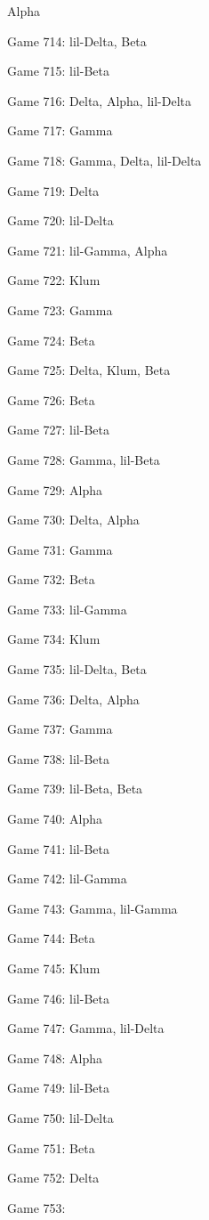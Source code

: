 \documentclass{article}
\begin{document}
\begin{multicols}{3}
\begin{compactitem}
Alpha
\item Game 714:
lil-Delta, Beta
\item Game 715:
lil-Beta
\item Game 716:
Delta, Alpha, lil-Delta
\item Game 717:
Gamma
\item Game 718:
Gamma, Delta, lil-Delta
\item Game 719:
Delta
\item Game 720:
lil-Delta
\item Game 721:
lil-Gamma, Alpha
\item Game 722:
Klum
\item Game 723:
Gamma
\item Game 724:
Beta
\item Game 725:
Delta, Klum, Beta
\item Game 726:
Beta
\item Game 727:
lil-Beta
\item Game 728:
Gamma, lil-Beta
\item Game 729:
Alpha
\item Game 730:
Delta, Alpha
\item Game 731:
Gamma
\item Game 732:
Beta
\item Game 733:
lil-Gamma
\item Game 734:
Klum
\item Game 735:
lil-Delta, Beta
\item Game 736:
Delta, Alpha
\item Game 737:
Gamma
\item Game 738:
lil-Beta
\item Game 739:
lil-Beta, Beta
\item Game 740:
Alpha
\item Game 741:
lil-Beta
\item Game 742:
lil-Gamma
\item Game 743:
Gamma, lil-Gamma
\item Game 744:
Beta
\item Game 745:
Klum
\item Game 746:
lil-Beta
\item Game 747:
Gamma, lil-Delta
\item Game 748:
Alpha
\item Game 749:
lil-Beta
\item Game 750:
lil-Delta
\item Game 751:
Beta
\item Game 752:
Delta
\item Game 753:

\end{compactitem}
\end{multicols}
\end{document}
